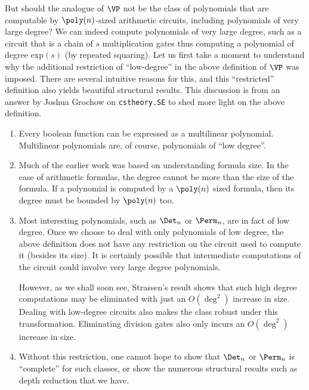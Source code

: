 But should the analogue of $\VP$ not be the class of polynomials that are computable by $\poly(n)$-sized arithmetic
circuits, including polynomials of very large degree?
We can indeed compute polynomials of very large degree, such as a circuit that is a chain of $s$ multiplication gates thus computing a polynomial of degree $\mathrm{exp}(s)$ (by repeated squaring). 
Let us first take a moment to understand why the additional restriction of ``low-degree'' in the above definition of $\VP$ was imposed. 
There are several intuitive reasons for this, and this ``restricted'' definition also yields beautiful structural results. 
This discussion is from an answer by Joshua Grochow on \texttt{cstheory.SE} \cite{gro:SE} to shed more light on the above definition. 

\begin{enumerate}

\item Every boolean function can be expressed as a multilinear polynomial. 
Multilinear polynomials are, of course, polynomials of ``low degree''. 

\item Much of the earlier work was based on understanding formula size. 
In the case of arithmetic formulas, the degree cannot be more than the size of the formula. 
If a polynomial is computed by a $\poly(n)$ sized formula, then its degree must be bounded by $\poly(n)$ too. 

\item Most interesting polynomials, such as $\Det_n$ or $\Perm_n$, are in fact of low degree. 
Once we choose to deal with only polynomials of low degree, the above definition does not have any restriction on the circuit used to compute it (besides its size). 
It is certainly possible that intermediate computations of the circuit could involve very large degree polynomials. 

However, as we shall soon see, Strassen's result shows that such high degree computations may be eliminated with just an $O(\deg^2)$ increase in size. 
Dealing with low-degree circuits also makes the class robust under this transformation. 
Eliminating division gates also only incurs an $O(\deg^2)$ increase in size. 

\item Without this restriction, one cannot hope to show that $\Det_n$ or $\Perm_n$ is ``complete'' for such classes, or
show the numerous structural results such as depth reduction that we have. 

\end{enumerate}

